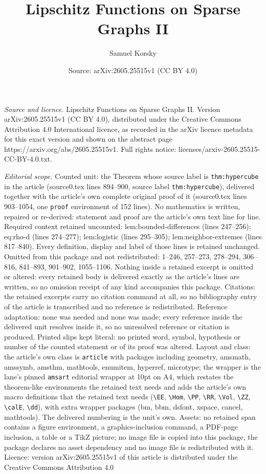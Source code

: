 \documentclass[10pt,a4paper]{amsart}
\title[Lipschitz Functions on Sparse Graphs II]{Lipschitz Functions on Sparse Graphs II}
\author{Samuel Korsky}
\date{Source: arXiv:2605.25515v1 (CC BY 4.0)}
\begin{document}
\maketitle

\noindent\emph{Source and licence.} Lipschitz Functions on Sparse Graphs II. Version arXiv:2605.25515v1 (CC BY 4.0), distributed under the Creative Commons Attribution 4.0 International licence, as recorded in the arXiv licence metadata for this exact version and shown on the abstract page https://arxiv.org/abs/2605.25515v1. Full rights notice: licenses/arxiv-2605.25515-CC-BY-4.0.txt.\par\smallskip

\noindent\textit{Editorial scope.} Counted unit: the Theorem whose source label is \texttt{thm:hypercube} in the article (source0.tex lines 894--900, source label \texttt{thm:hypercube}), delivered together with the article's own complete original proof of it (source0.tex lines 903--1054, one \texttt{proof} environment of 152 lines). No mathematics is written, repaired or re-derived: statement and proof are the article's own text line for line. Required context retained uncounted: lem:bounded-differences (lines 247--256); eq:rho-d (lines 274--277); lem:logistic (lines 295--305); lem:neighbor-extremes (lines 817--840). Every definition, display and label of those lines is retained unchanged. Omitted from this package and not redistributed: 1--246, 257--273, 278--294, 306--816, 841--893, 901--902, 1055--1106. Nothing inside a retained excerpt is omitted or altered: every retained body is delivered exactly as the article's lines are written, so no omission receipt of any kind accompanies this package. Citations: the retained excerpts carry no citation command at all, so no bibliography entry of the article is transcribed and no reference is redistributed. Reference adaptation: none was needed and none was made; every reference inside the delivered unit resolves inside it, so no unresolved reference or citation is produced. Printed slips kept literal: no printed word, symbol, hypothesis or number of the counted statement or of its proof was altered. Layout and class: the article's own class is \texttt{article} with packages including geometry, amsmath, amssymb, amsthm, mathtools, enumitem, hyperref, microtype; the wrapper is the lane's pinned \texttt{amsart} editorial wrapper at 10pt on A4, which restates the theorem-like environments the retained text needs and adds the article's own macro definitions that the retained text needs (\texttt{\textbackslash EE}, \texttt{\textbackslash Hom}, \texttt{\textbackslash PP}, \texttt{\textbackslash RR}, \texttt{\textbackslash Vol}, \texttt{\textbackslash ZZ}, \texttt{\textbackslash calE}, \texttt{\textbackslash dd}), with extra wrapper packages (bm, bbm, dsfont, xspace, cancel, mathtools). The delivered numbering is the unit's own. Assets: no retained span contains a figure environment, a graphics-inclusion command, a PDF-page inclusion, a table or a TikZ picture; no image file is copied into this package, the package declares no asset dependency and no image file is redistributed with it. Licence: version arXiv:2605.25515v1 of this article is distributed under the Creative Commons Attribution 4.0 
\end{document}
